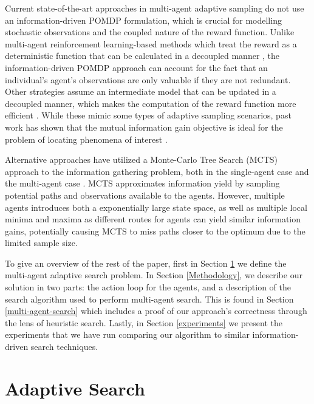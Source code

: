 \documentclass[letterpaper, 10 pt, conference]{IEEEConference}
\begin{document}
Current state-of-the-art approaches in multi-agent adaptive sampling do not use an information-driven POMDP formulation, which is crucial for modelling stochastic observations and the coupled nature of the reward function. Unlike multi-agent reinforcement learning-based methods which treat the reward as a deterministic function that can be calculated in a decoupled manner \cite{multi-rl-infomapf, proteins, MAAS}, the information-driven POMDP approach can account for the fact that an individual's agent's observations are only valuable if they are not redundant. Other strategies assume an intermediate model that can be updated in a decoupled manner, which makes the computation of the reward function more efficient \cite{bone2023decentralised, multi-agent-rrt, dec-pomdp}. While these mimic some types of adaptive sampling scenarios, past work has shown that the mutual information gain objective is ideal for the problem of locating phenomena of interest \cite{near-optimal-sampling, only-2-agents, single-agent-boat}. 

Alternative approaches have utilized a Monte-Carlo Tree Search (MCTS) approach to the information gathering problem, both in the single-agent case \cite{Ayton2017RiskboundedAI} and the multi-agent case \cite{bone2023decentralised}. MCTS approximates information yield by sampling potential paths and observations available to the agents. However, multiple agents introduces both a exponentially large state space, as well as multiple local minima and maxima as different routes for agents can yield similar information gains, potentially causing MCTS to miss paths closer to the optimum due to the limited sample size.

To give an overview of the rest of the paper, first in Section \ref{Adaptive Search} we define the multi-agent adaptive search problem.  In Section \ref{Methodology}, we describe our solution in two parts: the action loop for the agents, and a description of the search algorithm used to perform multi-agent search. This is found in Section \ref{multi-agent-search} which includes a proof of our approach's correctness through the lens of heuristic search. Lastly, in Section \ref{experiments} we present the experiments that we have run comparing our algorithm to similar information-driven search techniques.   

\section{Adaptive Search} 
\label{Adaptive Search}
\end{document}
